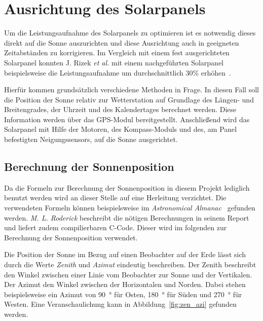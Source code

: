 
\section{Ausrichtung des Solarpanels}\label{sec:ausrichtung des Solarpanels}
Um die Leistungsaufnahme des Solarpanels zu optimieren ist es notwendig dieses direkt auf die Sonne auszurichten und diese Ausrichtung auch in geeigneten Zeitabständen zu korrigieren. Im Vergleich mit einem fest ausgerichteten Solarpanel konnten J. Rizek \emph{et al.} mit einem nachgeführten Solarpanel beispielsweise die Leistungsaufnahme um durchschnittlich 30\% erhöhen~\cite{Rizek2008}.

Hierfür kommen grundsätzlich verschiedene Methoden in Frage. In diesen Fall soll die Position der Sonne relativ zur Wetterstation auf Grundlage des Längen- und Breitengrades, der Uhrzeit und des Kalendertages berechnet werden. Diese Information werden über das GPS-Modul bereitgestellt. Anschließend wird das Solarpanel mit Hilfe der Motoren, des Kompass-Moduls und des, am Panel befestigten Neigungssensors, auf die Sonne ausgerichtet.

\subsection{Berechnung der Sonnenposition}\label{sec:berechnung_der_sonnenposition}
Da die Formeln zur Berechnung der Sonnenposition in diesem Projekt lediglich benutzt werden wird an dieser Stelle auf eine Herleitung verzichtet. Die verwendeten Formeln können beispielsweise im \emph{Astronomical Almanac}~\cite{Anon1984} gefunden werden. \emph{M. L. Roderick} beschreibt die nötigen Berechnungen in seinem Report~\cite{Roderick1992} und liefert zudem compilierbaren C-Code. Dieser wird im folgenden zur Berechnung der Sonnenposition verwendet.

Die Position der Sonne im Bezug auf einen Beobachter auf der Erde lässt sich durch die Werte \emph{Zenith} und \emph{Azimut} eindeutig beschreiben. Der Zenith beschreibt den Winkel zwischen einer Linie vom Beobachter zur Sonne und der Vertikalen. Der Azimut den Winkel zwischen der Horizontalen und Norden. Dabei stehen beispielsweise ein Azimut von \SI{90}{\degree} für Osten, \SI{180}{\degree} für Süden und \SI{270}{\degree} für Westen. Eine Veranschaulichung kann in Abbildung~\ref{fig:zen_azi} gefunden werden.

